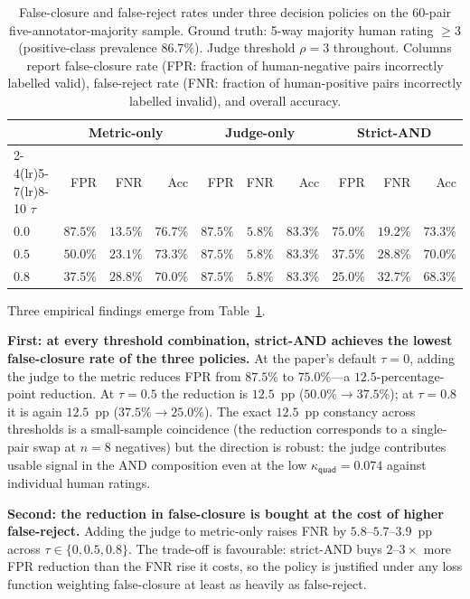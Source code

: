 \begin{table}[t]
  \centering
  \caption{False-closure and false-reject rates under three decision
    policies on the 60-pair five-annotator-majority sample. Ground truth:
    5-way majority human rating $\geq 3$ (positive-class prevalence
    $86.7\%$). Judge threshold $\rho = 3$ throughout. Columns report
    false-closure rate (FPR: fraction of human-negative pairs incorrectly
    labelled valid), false-reject rate (FNR: fraction of human-positive
    pairs incorrectly labelled invalid), and overall accuracy.}
  \label{tab:strict_and_ablation}
  \begin{tabular}{lrrrrrrrrr}
    \toprule
    & \multicolumn{3}{c}{Metric-only}
    & \multicolumn{3}{c}{Judge-only}
    & \multicolumn{3}{c}{Strict-AND} \\
    \cmidrule(lr){2-4}\cmidrule(lr){5-7}\cmidrule(lr){8-10}
    $\tau$
    & FPR & FNR & Acc & FPR & FNR & Acc & FPR & FNR & Acc \\
    \midrule
    $0.0$ & $87.5\%$ & $13.5\%$ & $76.7\%$ & $87.5\%$ & $5.8\%$ & $83.3\%$
          & $75.0\%$ & $19.2\%$ & $73.3\%$ \\
    $0.5$ & $50.0\%$ & $23.1\%$ & $73.3\%$ & $87.5\%$ & $5.8\%$ & $83.3\%$
          & $37.5\%$ & $28.8\%$ & $70.0\%$ \\
    $0.8$ & $37.5\%$ & $28.8\%$ & $70.0\%$ & $87.5\%$ & $5.8\%$ & $83.3\%$
          & $25.0\%$ & $32.7\%$ & $68.3\%$ \\
    \bottomrule
  \end{tabular}
\end{table}

Three empirical findings emerge from Table~\ref{tab:strict_and_ablation}.

\textbf{First: at every threshold combination, strict-AND achieves the
lowest false-closure rate of the three policies.} At the paper's
default $\tau = 0$, adding the judge to the metric reduces FPR from
$87.5\%$ to $75.0\%$---a $12.5$-percentage-point reduction. At
$\tau = 0.5$ the reduction is $12.5$~pp ($50.0\% \to 37.5\%$); at
$\tau = 0.8$ it is again $12.5$~pp ($37.5\% \to 25.0\%$). The exact
$12.5$~pp constancy across thresholds is a small-sample coincidence
(the reduction corresponds to a single-pair swap at $n = 8$ negatives)
but the direction is robust: the judge contributes usable signal in
the AND composition even at the low $\kappa_{\textsf{quad}} = 0.074$
against individual human ratings.

\textbf{Second: the reduction in false-closure is bought at the cost
of higher false-reject.} Adding the judge to metric-only raises FNR
by $5.8$--$5.7$--$3.9$~pp across $\tau \in \{0, 0.5, 0.8\}$. The
trade-off is favourable: strict-AND buys $2$--$3\times$ more FPR
reduction than the FNR rise it costs, so the policy is justified
under any loss function weighting false-closure at least as heavily
as false-reject.

